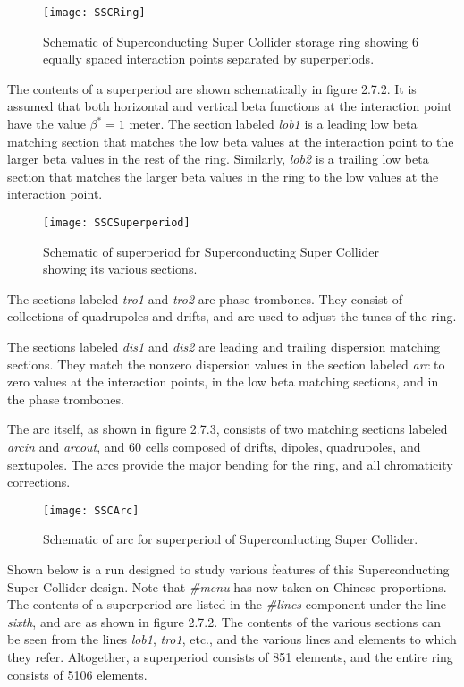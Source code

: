 \begin{figure}[hbp]
  \centering
  \texttt{[image: SSCRing]}
  \caption{Schematic of Superconducting Super Collider
          storage ring showing 6 equally spaced interaction points
separated by superperiods.}
\end{figure}

     The contents of a superperiod are shown schematically in figure 2.7.2.
It is assumed that both horizontal and vertical beta functions at the
interaction point have the value $\beta^*=1 \mbox{ meter}$.  The section labeled {\em lob1 } is a leading low beta matching section that matches the low beta values at the
interaction point to the larger beta values in the rest of the ring.
Similarly, {\em lob2 } is a trailing low beta section that matches the larger beta
values in the ring to the low values at the interaction point.

\begin{figure}[htbp]
  \centering
  \texttt{[image: SSCSuperperiod]}
  \caption{Schematic of superperiod for Superconducting
                Super Collider showing its various sections.}
\end{figure}

The sections labeled {\em tro1 } and {\em tro2 } are phase trombones.  They consist
of collections of quadrupoles and drifts, and are used to adjust the tunes
of the ring.

     The sections labeled {\em dis1 } and {\em dis2 } are leading and trailing dispersion
matching sections.  They match the nonzero dispersion values in the section
labeled {\em arc } to zero values at the interaction points, in the low beta
matching sections, and in the phase trombones.

     The arc itself, as shown in figure 2.7.3, consists of two matching
sections labeled {\em arcin } and {\em arcout}, and 60 cells composed of drifts,
dipoles, quadrupoles, and sextupoles.  The arcs provide the major bending
for the ring, and all chromaticity corrections.

\begin{figure}[htbp]
  \centering
  \texttt{[image: SSCArc]}
  \caption{ Schematic of arc for superperiod of
                       Superconducting Super Collider.}
\end{figure}

     Shown below is a \Mary run designed to study various features of
this Superconducting Super Collider design.  Note that {\em \#menu} has now taken
on Chinese proportions.  The contents of a superperiod are listed in the
{\em \#lines} component under the line {\em sixth}, and are as shown in figure
2.7.2.
The contents of the various sections can be seen from the lines {\em lob1}, {\em tro1},
etc., and the various lines and elements to which they refer.  Altogether,
a superperiod consists of 851 elements, and the entire ring consists of
5106 elements.

